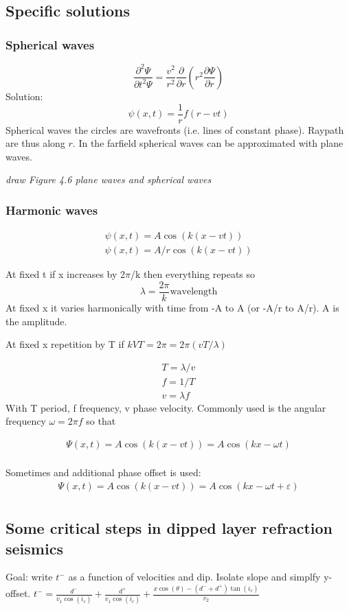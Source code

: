 \documentclass[a4paper,12pt,fleqn]{article}
\begin{document}
\subsection{Specific solutions}
\subsubsection{Spherical waves}
$$
\frac{\partial^2 \Psi}{\partial t^2 \Psi} = \frac{v^2}{r^2}\frac{\partial}{\partial r}\left(r^2\frac{\partial\Psi}{\partial r}\right)
$$
Solution:
$$
\psi(x,t) = \frac{1}{r}f(r-vt)
$$
Spherical waves the circles are wavefronts (i.e. lines of constant phase). Raypath are thus along $r$. In the farfield spherical waves can be approximated with plane waves.

\textit{draw Figure 4.6 plane waves and spherical waves}
\subsubsection{Harmonic waves}
\begin{eqnarray}
\psi(x,t) = A\cos(k(x-vt))\\
\psi(x,t) = A/r \cos(k(x-vt))
\end{eqnarray}

At fixed t if x increases by 2$\pi$/k then everything repeats so 
$$
\lambda = \frac{2\pi}{k} \text{wavelength}
$$ 
At fixed x it varies harmonically with time from -A to A (or -A/r to A/r). A is the amplitude.

At fixed x repetition by T if  $kVT=2\pi = 2\pi(vT/\lambda)$

\begin{eqnarray}
  T = \lambda/v \\
  f = 1/T \\
  v = \lambda f
\end{eqnarray}
With T period, f frequency, v phase velocity. Commonly used is the angular frequency $\omega = 2\pi f$ so that

\begin{eqnarray}
  \Psi(x,t) = A\cos(k(x-vt)) = A\cos(kx-\omega t) \\
\end{eqnarray}

Sometimes and additional phase offset is used:
\begin{eqnarray}
  \Psi(x,t) = A\cos(k(x-vt)) = A\cos(kx-\omega t+\varepsilon) \\
\end{eqnarray}


\subsection{Some critical steps in dipped layer refraction seismics}
Goal: write $t^-$ as a function of velocities and dip. Isolate slope and simplfy y-offset.
$t^- = \frac{d^-}{v_1\cos(i_c)} + \frac{d^+}{v_1\cos(i_c)} + \frac{x\cos(\theta)-(d^-+d^+)\tan(i_c)}{v_2}$
\end{document}
